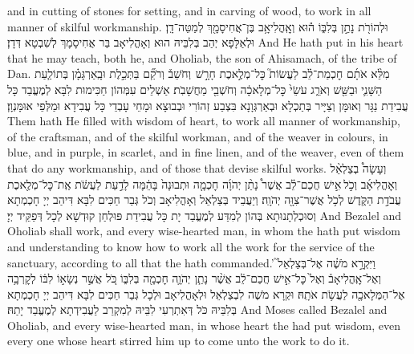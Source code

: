 {and in cutting of stones for setting, and in carving of wood, to work in all manner of skilful workmanship.}{}
{וּלְהוֹרֹ֖ת נָתַ֣ן בְּלִבּ֑וֹ ה֕וּא וְאׇֽהֳלִיאָ֥ב בֶּן־אֲחִיסָמָ֖ךְ לְמַטֵּה־דָֽן׃
}
{וּלְאַלָּפָא יְהַב בְּלִבֵּיהּ הוּא וְאָהֳלִיאָב בַּר אֲחִיסָמָךְ לְשִׁבְטָא דְּדָן׃}
{And He hath put in his heart that he may teach, both he, and Oholiab, the son of Ahisamach, of the tribe of Dan.}{}
{מִלֵּ֨א אֹתָ֜ם חׇכְמַת־לֵ֗ב לַעֲשׂוֹת֮ כׇּל־מְלֶ֣אכֶת חָרָ֣שׁ \pasek  וְחֹשֵׁב֒ וְרֹקֵ֞ם בַּתְּכֵ֣לֶת וּבָֽאַרְגָּמָ֗ן בְּתוֹלַ֧עַת הַשָּׁנִ֛י וּבַשֵּׁ֖שׁ וְאֹרֵ֑ג עֹשֵׂי֙ כׇּל־מְלָאכָ֔ה וְחֹשְׁבֵ֖י מַחֲשָׁבֹֽת׃}
{אַשְׁלֵים עִמְּהוֹן חַכִּימוּת לִבָּא לְמֶעֱבַד כָּל עֲבִידַת נַגָּר וְאוּמָּן וְצַיָּיר בְּתַכְלָא וּבְאַרְגְּוָנָא בִּצְבַע זְהוֹרִי וּבְבוּצָא וּמָחֵי עָבְדֵי כָּל עֲבִידָא וּמַלְּפֵי אוּמָּנְוָן׃}
{Them hath He filled with wisdom of heart, to work all manner of workmanship, of the craftsman, and of the skilful workman, and of the weaver in colours, in blue, and in purple, in scarlet, and in fine linen, and of the weaver, even of them that do any workmanship, and of those that devise skilful works.}{}
\newperek
{}%
{וְעָשָׂה֩ בְצַלְאֵ֨ל וְאׇהֳלִיאָ֜ב וְכֹ֣ל \legarmeh  אִ֣ישׁ חֲכַם־לֵ֗ב אֲשֶׁר֩ נָתַ֨ן יְהֹוָ֜ה חׇכְמָ֤ה וּתְבוּנָה֙ בָּהֵ֔מָּה לָדַ֣עַת לַעֲשֹׂ֔ת אֶֽת־כׇּל־מְלֶ֖אכֶת עֲבֹדַ֣ת הַקֹּ֑דֶשׁ לְכֹ֥ל אֲשֶׁר־צִוָּ֖ה יְהֹוָֽה׃}
{וְיַעֲבֵיד בְּצַלְאֵל וְאָהֳלִיאָב וְכֹל גְּבַר חַכִּים לִבָּא דִּיהַב יְיָ חָכְמְתָא וְסוּכְלְתָנוּתָא בְּהוֹן לְמִדַּע לְמֶעֱבַד יָת כָּל עֲבִידַת פּוּלְחַן קוּדְשָׁא לְכָל דְּפַקֵּיד יְיָ׃}
{And Bezalel and Oholiab shall work, and every wise-hearted man, in whom the \lord\space hath put wisdom and understanding to know how to work all the work for the service of the sanctuary, according to all that the \lord\space hath commanded.’}{}
{וַיִּקְרָ֣א מֹשֶׁ֗ה אֶל־בְּצַלְאֵל֮ וְאֶל־אׇֽהֳלִיאָב֒ וְאֶל֙ כׇּל־אִ֣ישׁ חֲכַם־לֵ֔ב אֲשֶׁ֨ר נָתַ֧ן יְהֹוָ֛ה חׇכְמָ֖ה בְּלִבּ֑וֹ כֹּ֚ל אֲשֶׁ֣ר נְשָׂא֣וֹ לִבּ֔וֹ לְקׇרְבָ֥ה אֶל־הַמְּלָאכָ֖ה לַעֲשֹׂ֥ת אֹתָֽהּ׃}
{וּקְרָא מֹשֶׁה לִבְצַלְאֵל וּלְאָהֳלִיאָב וּלְכָל גְּבַר חַכִּים לִבָּא דִּיהַב יְיָ חָכְמְתָא בְּלִבֵּיהּ כֹּל דְּאִתְרְעִי לִבֵּיהּ לְמִקְרַב לַעֲבִידְתָא לְמֶעֱבַד יָתַהּ׃}
{And Moses called Bezalel and Oholiab, and every wise-hearted man, in whose heart the \lord\space had put wisdom, even every one whose heart stirred him up to come unto the work to do it.}{}
